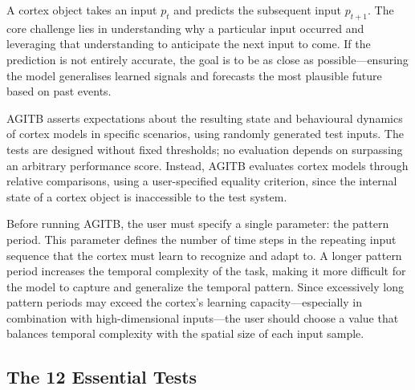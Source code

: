 \documentclass{article}
\begin{document}
A cortex object takes an input $p_t$ and predicts the subsequent input $p_{t+1}$. The core challenge lies in understanding why a particular input occurred and leveraging that understanding to anticipate the next input to come. If the prediction is not entirely accurate, the goal is to be as close as possible—ensuring the model generalises learned signals and forecasts the most plausible future based on past events.

AGITB asserts expectations about the resulting state and behavioural dynamics of cortex models in specific scenarios, using randomly generated test inputs. The tests are designed without fixed thresholds; no evaluation depends on surpassing an arbitrary performance score. Instead, AGITB evaluates cortex models through relative comparisons, using a user-specified equality criterion, since the internal state of a cortex object is inaccessible to the test system.

Before running AGITB, the user must specify a single parameter: the pattern period. This parameter defines the number of time steps in the repeating input sequence that the cortex must learn to recognize and adapt to. A longer pattern period increases the temporal complexity of the task, making it more difficult for the model to capture and generalize the temporal pattern. Since excessively long pattern periods may exceed the cortex’s learning capacity—especially in combination with high-dimensional inputs—the user should choose a value that balances temporal complexity with the spatial size of each input sample.

\subsection{The 12 Essential Tests}
\end{document}
